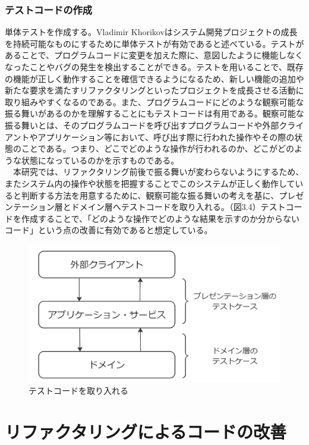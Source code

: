 \documentclass[12pt, a4paper]{jreport}
\begin{document}
\subsection{テストコードの作成}
単体テストを作成する。Vladimir Khorikovはシステム開発プロジェクトの成長を持続可能なものにするために単体テストが有効であると述べている。テストがあることで、プログラムコードに変更を加えた際に、意図したように機能しなくなったことやバグの発生を検出することができる。テストを用いることで、既存の機能が正しく動作することを確信できるようになるため、新しい機能の追加や新たな要求を満たすリファクタリングといったプロジェクトを成長させる活動に取り組みやすくなるのである。また、プログラムコードにどのような観察可能な振る舞いがあるのかを理解することにもテストコードは有用である。観察可能な振る舞いとは、そのプログラムコードを呼び出すプログラムコードや外部クライアントやアプリケーション等において、呼び出す際に行われた操作やその際の状態のことである。つまり、どこでどのような操作が行われるのか、どこがどのような状態になっているのかを示すものである。
\\　本研究では、リファクタリング前後で振る舞いが変わらないようにするため、またシステム内の操作や状態を把握することでこのシステムが正しく動作していると判断する方法を用意するために、観察可能な振る舞いの考えを基に、プレゼンテーション層とドメイン層へテストコードを取り入れる。（図3.4）テストコードを作成することで、「どのような操作でどのような結果を示すのか分からないコード」という点の改善に有効であると想定している。
\begin{figure}[H]
\centering
\includegraphics[width=1\linewidth]{image/layerTest.png}
\caption{テストコードを取り入れる}
\label{fig:enter-label}
\end{figure}
\chapter{リファクタリングによるコードの改善}
\end{document}
